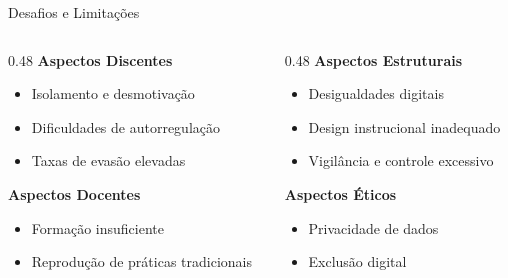 \documentclass[aspectratio=169,xcolor=table]{beamer}
\begin{document}
\begin{frame}{Desafios e Limitações}
    \begin{columns}[T]
        \begin{column}{0.48\textwidth}
            \textbf{Aspectos Discentes}
            \begin{itemize}
                \item Isolamento e desmotivação
                \item Dificuldades de autorregulação
                \item Taxas de evasão elevadas
            \end{itemize}
            \vspace{0.5em}
            \textbf{Aspectos Docentes}
            \begin{itemize}
                \item Formação insuficiente
                \item Reprodução de práticas tradicionais
            \end{itemize}
        \end{column}
        \begin{column}{0.48\textwidth}
            \textbf{Aspectos Estruturais}
            \begin{itemize}
                \item Desigualdades digitais
                \item Design instrucional inadequado
                \item Vigilância e controle excessivo
            \end{itemize}
            \vspace{0.5em}
            \textbf{Aspectos Éticos}
            \begin{itemize}
                \item Privacidade de dados
                \item Exclusão digital
            \end{itemize}
        \end{column}
    \end{columns}
\end{frame}
\end{document}
